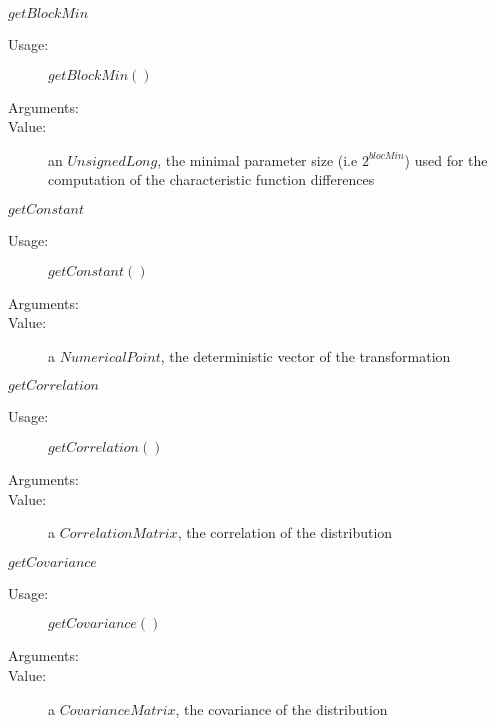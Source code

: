 \begin{description}
\begin{description}
  \item $getBlockMin$
    \begin{description}
    \item[Usage:]  $getBlockMin()$
    \item[Arguments:]  \strut
    \item[Value:] an $UnsignedLong$, the minimal parameter size (i.e $2^{blocMin}$) used for the computation of the characteristic function differences
    \end{description}

  \item $getConstant$
    \begin{description}
    \item[Usage:]  $getConstant()$
    \item[Arguments:]  \strut
    \item[Value:] a $NumericalPoint$, the deterministic vector of the transformation
    \end{description}

  \item $getCorrelation$
    \begin{description}
    \item[Usage:]  $getCorrelation()$
    \item[Arguments:]  \strut
    \item[Value:] a $CorrelationMatrix$, the correlation of the distribution
    \end{description}

  \item $getCovariance$
    \begin{description}
    \item[Usage:]  $getCovariance()$
    \item[Arguments:]  \strut
    \item[Value:] a $CovarianceMatrix$, the covariance of the distribution
    \end{description}


\end{description}
\end{description}
